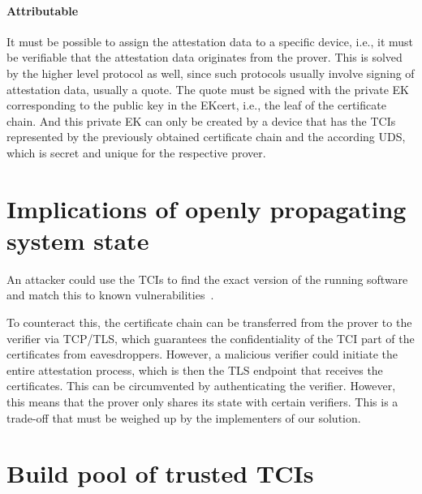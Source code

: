 \paragraph{Attributable}
It must be possible to assign the attestation data to a specific device, i.e., it must be verifiable that the attestation data originates from the prover.
This is solved by the higher level protocol as well, since such protocols usually involve signing of attestation data, usually a quote.
The quote must be signed with the private EK corresponding to the public key in the EKcert, i.e., the leaf of the certificate chain.
And this private EK can only be created by a device that has the TCIs represented by the previously obtained certificate chain and the according UDS, which is secret and unique for the respective prover.



\section{Implications of openly propagating system state}

An attacker could use the TCIs to find the exact version of the running software and match this to known vulnerabilities~\cite{rfc9334}.

To counteract this, the certificate chain can be transferred from the prover to the verifier via TCP/TLS, which guarantees the confidentiality of the TCI part of the certificates from eavesdroppers.
However, a malicious verifier could initiate the entire attestation process, which is then the TLS endpoint that receives the certificates.
This can be circumvented by authenticating the verifier.
However, this means that the prover only shares its state with certain verifiers.
This is a trade-off that must be weighed up by the implementers of our solution.


\section{Build pool of trusted TCIs}

